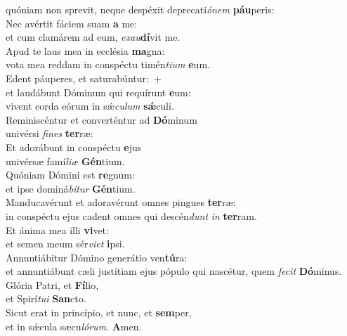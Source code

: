 \oddverse quóniam non sprevit, neque despéxit deprecati\textit{ó}\textit{nem} \textbf{páu}peris:\\
\evenverse Nec avértit fáciem suam \textbf{a} me:~\*\\
\evenverse et cum clamárem ad eum, \textit{e}\textit{xau}\textbf{dí}vit me.\\
\oddverse Apud te laus mea in ecclésia \textbf{ma}gna:~\*\\
\oddverse vota mea reddam in conspéctu timén\textit{ti}\textit{um} \textbf{e}um.\\
\evenverse Edent páuperes, et saturabúntur:~+\\
\evenverse  et laudábunt Dóminum qui requírunt \textbf{e}um:~\*\\
\evenverse vivent corda eórum in sǽ\textit{cu}\textit{lum} \textbf{sǽ}culi.\\
\oddverse Reminiscéntur et converténtur ad \textbf{Dó}minum~\*\\
\oddverse univérsi \textit{fi}\textit{nes} \textbf{ter}ræ:\\
\evenverse Et adorábunt in conspéctu \textbf{e}jus~\*\\
\evenverse univérsæ famí\textit{li}\textit{æ} \textbf{Gén}tium.\\
\oddverse Quóniam Dómini est \textbf{re}gnum:~\*\\
\oddverse et ipse dominá\textit{bi}\textit{tur} \textbf{Gén}tium.\\
\evenverse Manducavérunt et adoravérunt omnes pingues \textbf{ter}ræ:~\*\\
\evenverse in conspéctu ejus cadent omnes qui descén\textit{dunt} \textit{in} \textbf{ter}ram.\\
\oddverse Et ánima mea illi \textbf{vi}vet:~\*\\
\oddverse et semen meum sér\textit{vi}\textit{et} \textbf{i}psi.\\
\evenverse Annuntiábitur Dómino generátio ven\textbf{tú}ra:~\*\\
\evenverse et annuntiábunt cæli justítiam ejus pópulo qui nascétur, quem \textit{fe}\textit{cit} \textbf{Dó}minus.\\
\oddverse Glória Patri, et \textbf{Fí}lio,~\*\\
\oddverse et Spirí\textit{tu}\textit{i} \textbf{San}cto.\\
\evenverse Sicut erat in princípio, et nunc, et \textbf{sem}per,~\*\\
\evenverse et in sǽcula sæcu\textit{ló}\textit{rum}. \textbf{A}men.\\

